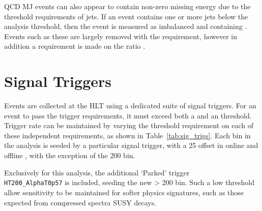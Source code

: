 QCD MJ events can also appear to contain non-zero missing energy 
due to the threshold requirements of jets. If an event contains 
one or more jets below the analysis threshold, then the 
event is measured as imbalanced and containing \mht. Events such as these are largely 
removed with the \alphat requirement, however in addition a requirement is made on the
ratio \mhtmet.



\section{Signal Triggers}

Events are collected at the HLT using a dedicated suite of
signal triggers. For an event to pass the trigger
requirements, it must exceed both a \HT and an \alphat threshold. Trigger rate 
can be maintained by varying the
threshold requirement on each of these independent requirements, as shown in
Table~\ref{tab:sig_trigs}. Each \HT bin in the analysis is seeded by a
particular signal
trigger, with a 25 \gev offset in online and offline \HT, with the exception of
the 200 \gev bin.

Exclusively for this analysis, the additional `Parked' trigger 
\\\verb!HT200_AlphaT0p57! is included, seeding the new \HT> 200 \gev bin. Such a low
threshold allow sensitivity to be maintained for softer physics signatures, such
as those expected from compressed spectra SUSY decays.

